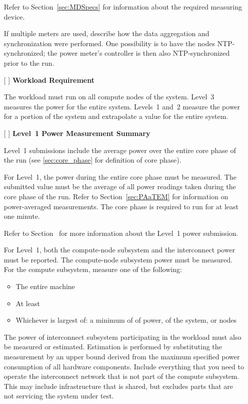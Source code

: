 \begin{itemize}
Refer to Section~\ref{sec:MDSpecs} for information about the required measuring device.

If multiple meters are used, describe how the data aggregation and synchronization were performed.
One possibility is to have the nodes NTP-synchronized; the power meter's controller is then also NTP-synchronized prior to the run.

\item[{[ ]}]
\textbf{Workload Requirement}

The workload must run on all compute nodes of the system.
Level~3 measures the power for the entire system.
Levels~1 and~2 measure the power for a portion of the system and extrapolate a value for the entire system.

\item[{[ ]}]
\textbf{Level~1 Power Measurement Summary}

Level~1 submissions include the average power over the entire core phase of the run (see \ref{sec:core_phase} for definition of core phase).

For Level~1, the power during the entire core phase must be measured.
The submitted value must be the average of all power readings taken during the core phase of the run.
Refer to Section~\ref{sec:PAaTEM} for information on power-averaged measurements.
The core phase is required to run for at least one minute.

Refer to Section~ for more information about the Level~1 power submission.

For Level~1, both the compute-node subsystem and the interconnect power must be reported.
The compute-node subsystem power must be measured.
For the compute subsystem, measure one of the following:
\begin{itemize}
\item The entire machine
\item At least \SpecPowerMaxLOne{}
\item Whichever is largest of: a minimum of \SpecPowerMinLOne{} of power, \SpecFracMinLOne{} of the system, or \SpecMinNodes{} nodes
\end{itemize}

The power of interconnect subsystem participating in the workload must also be measured or estimated.
Estimation is performed by substituting the measurement by an upper bound derived from the maximum specified power consumption of all hardware components.
Include everything that you need to operate the interconnect network that is not part of the compute subsystem.
This may include infrastructure that is shared, but excludes parts that are not servicing the system under test.


\end{itemize}
